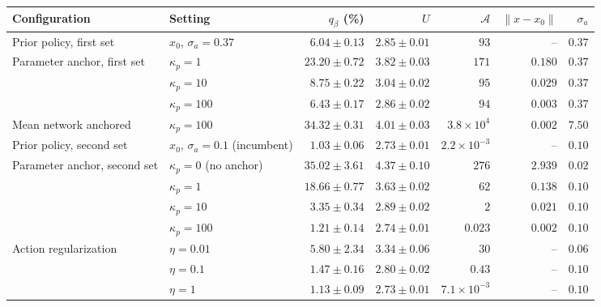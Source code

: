 \setlength{\tabcolsep}{4pt}\begin{tabular}{llrrrrr}
\toprule
Configuration & Setting & $q_\beta$ (\%) & $U$ & $\mathcal A$ & $\|x-x_0\|$ & $\sigma_a$ \\
\midrule
Prior policy, first set & $x_0$, $\sigma_a=0.37$ & $6.04\pm0.13$ & $2.85\pm0.01$ & $93$ & -- & $0.37$ \\
Parameter anchor, first set & $\kappa_p=1$ & $23.20\pm0.72$ & $3.82\pm0.03$ & $171$ & $0.180$ & $0.37$ \\
 & $\kappa_p=10$ & $8.75\pm0.22$ & $3.04\pm0.02$ & $95$ & $0.029$ & $0.37$ \\
 & $\kappa_p=100$ & $6.43\pm0.17$ & $2.86\pm0.02$ & $94$ & $0.003$ & $0.37$ \\
Mean network anchored & $\kappa_p=100$ & $34.32\pm0.31$ & $4.01\pm0.03$ & $3.8\times10^{4}$ & $0.002$ & $7.50$ \\
Prior policy, second set & $x_0$, $\sigma_a=0.1$ (incumbent) & $1.03\pm0.06$ & $2.73\pm0.01$ & $2.2\times10^{-3}$ & -- & $0.10$ \\
Parameter anchor, second set & $\kappa_p=0$ (no anchor) & $35.02\pm3.61$ & $4.37\pm0.10$ & $276$ & $2.939$ & $0.02$ \\
 & $\kappa_p=1$ & $18.66\pm0.77$ & $3.63\pm0.02$ & $62$ & $0.138$ & $0.10$ \\
 & $\kappa_p=10$ & $3.35\pm0.34$ & $2.89\pm0.02$ & $2$ & $0.021$ & $0.10$ \\
 & $\kappa_p=100$ & $1.21\pm0.14$ & $2.74\pm0.01$ & $0.023$ & $0.002$ & $0.10$ \\
Action regularization & $\eta=0.01$ & $5.80\pm2.34$ & $3.34\pm0.06$ & $30$ & -- & $0.06$ \\
 & $\eta=0.1$ & $1.47\pm0.16$ & $2.80\pm0.02$ & $0.43$ & -- & $0.10$ \\
 & $\eta=1$ & $1.13\pm0.09$ & $2.73\pm0.01$ & $7.1\times10^{-3}$ & -- & $0.10$ \\
\bottomrule
\end{tabular}
